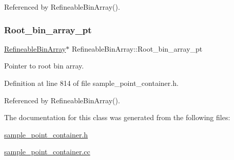 Referenced by Refineable\+Bin\+Array().

\mbox{\label{classRefineableBinArray_a5b75f5d76558759afe6ebae878f35f50}} 
\subsubsection{\texorpdfstring{Root\+\_\+bin\+\_\+array\+\_\+pt}{Root\_bin\_array\_pt}}
{\footnotesize\ttfamily \hyperlink{classRefineableBinArray}{Refineable\+Bin\+Array}$\ast$ Refineable\+Bin\+Array\+::\+Root\+\_\+bin\+\_\+array\+\_\+pt\hspace{0.3cm}{\ttfamily [private]}}



Pointer to root bin array. 



Definition at line 814 of file sample\+\_\+point\+\_\+container.\+h.



Referenced by Refineable\+Bin\+Array().



The documentation for this class was generated from the following files\+:\begin{DoxyCompactItemize}
\item 
\hyperlink{sample__point__container_8h}{sample\+\_\+point\+\_\+container.\+h}\item 
\hyperlink{sample__point__container_8cc}{sample\+\_\+point\+\_\+container.\+cc}\end{DoxyCompactItemize}
